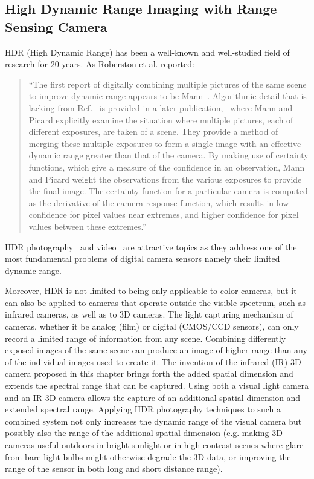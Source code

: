 \subsection{High Dynamic Range Imaging with Range Sensing Camera}
HDR (High Dynamic Range) has been a well-known and well-studied field of
research for 20 years.  As Roberston et al. reported:
\begin{quote}
``The first report of digitally combining multiple pictures
 of the same scene to improve dynamic range appears to be
 Mann~\cite{mannist}.
 Algorithmic detail that is lacking from Ref.~\cite{mannist} is
 provided in a later publication,~\cite{mannwyckofftr}
 where Mann and Picard explicitly examine the situation where multiple pictures,
 each of different exposures, are taken of a scene. They
 provide a method of merging these multiple exposures to
 form a single image with an effective dynamic range
 greater than that of the camera. By making use of certainty
 functions, which give a measure of the confidence in an
 observation, Mann and Picard weight the observations from
 the various exposures to provide the final image. The certainty
 function for a particular camera is computed as the
 derivative of the camera response function, which results in
 low confidence for pixel values near extremes, and higher
 confidence for pixel values
 between these extremes.''~\cite{robertson2003estimation}
\end{quote}

HDR photography~\cite{candocia1, candocia2, candocia3,wyckoff1962experimental,mann1993compositing}
and video~\cite{mann2012hdrchitecture,lo2012high,mann2012realtime, HDRVideoCamera11, kang2003high}
are attractive topics as they address one of the most fundamental problems of
digital camera sensors namely their limited dynamic range.

Moreover, HDR is not limited to being only applicable to color cameras, but it can also be applied to cameras that operate outside the visible spectrum, such as infrared cameras, as well as to 3D cameras.  The light capturing mechanism of cameras, whether it be analog (film) or digital (CMOS/CCD sensors), can only record a limited range of information from any scene. Combining differently exposed images of the same scene can produce an image of higher range than any of the individual images used to create it. The invention of the infrared (IR) 3D camera proposed in this chapter brings forth the added spatial dimension and extends the spectral range that can be captured. Using both a visual light camera and an IR-3D camera allows the capture of an additional spatial dimension and extended spectral range. Applying HDR photography techniques to such a combined system not only increases the dynamic range of the visual camera but possibly also the range of the additional spatial dimension (e.g. making 3D cameras useful outdoors in bright sunlight or in high contrast scenes where glare from bare light bulbs might otherwise degrade the 3D data, or improving the range of the sensor in both long and short distance range).

